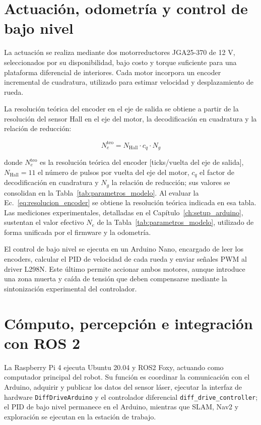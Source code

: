 \section{Actuación, odometría y control de bajo nivel}

La actuación se realiza mediante dos motorreductores JGA25-370 de 12 V, seleccionados por su disponibilidad, bajo costo y torque suficiente para una plataforma diferencial de interiores. Cada motor incorpora un encoder incremental de cuadratura, utilizado para estimar velocidad y desplazamiento de rueda.

La resolución teórica del encoder en el eje de salida se obtiene a partir de la resolución del sensor Hall en el eje del motor, la decodificación en cuadratura y la relación de reducción:

\begin{equation}
N_e^{\mathrm{teo}} = N_{\mathrm{Hall}} \cdot c_q \cdot N_g
\label{eq:resolucion_encoder}
\end{equation}

donde $N_e^{\mathrm{teo}}$ es la resolución teórica del encoder [ticks/vuelta del eje de salida], $N_{\mathrm{Hall}}=11$ el número de pulsos por vuelta del eje del motor, $c_q$ el factor de decodificación en cuadratura y $N_g$ la relación de reducción; sus valores se consolidan en la Tabla~\ref{tab:parametros_modelo}. Al evaluar la Ec.~\ref{eq:resolucion_encoder} se obtiene la resolución teórica indicada en esa tabla. Las mediciones experimentales, detalladas en el Capítulo~\ref{ch:setup_arduino}, sustentan el valor efectivo $N_e$ de la Tabla~\ref{tab:parametros_modelo}, utilizado de forma unificada por el firmware y la odometría.

El control de bajo nivel se ejecuta en un \gls{Arduino} Nano, encargado de leer los encoders, calcular el PID de velocidad de cada rueda y enviar señales \gls{PWM} al driver L298N. Este último permite accionar ambos motores, aunque introduce una zona muerta y caída de tensión que deben compensarse mediante la sintonización experimental del controlador.

\section{Cómputo, percepción e integración con ROS 2}

La Raspberry Pi 4 ejecuta Ubuntu 20.04 y \gls{ROS2} Foxy, actuando como computador principal del robot. Su función es coordinar la comunicación con el \gls{Arduino}, adquirir y publicar los datos del sensor láser, ejecutar la interfaz de hardware \texttt{DiffDriveArduino} y el controlador diferencial \texttt{diff\_drive\_controller}; el PID de bajo nivel permanece en el \gls{Arduino}, mientras que SLAM, Nav2 y exploración se ejecutan en la estación de trabajo.


